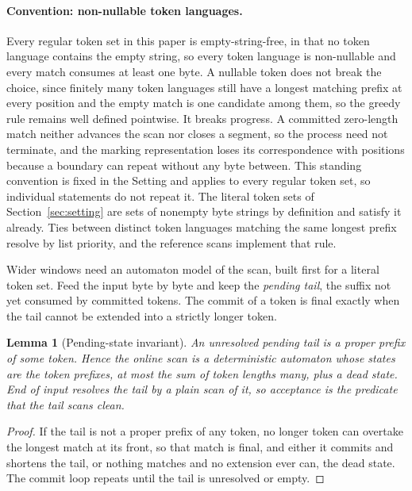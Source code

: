 \documentclass[11pt,a4paper]{article}
\theoremstyle{definition}
\theoremstyle{plain}
\newtheorem{lemma}{Lemma}
\begin{document}
\paragraph{Convention: non-nullable token languages.} Every regular token set in this paper is empty-string-free, in
that no token language contains the empty string, so every token language is non-nullable and every match consumes at
least one byte. A nullable token does not break the choice, since finitely many token languages still have a longest
matching prefix at every position and the empty match is one candidate among them, so the greedy rule remains well
defined pointwise. It breaks progress. A committed zero-length match neither advances the scan nor closes a segment, so
the process need not terminate, and the marking representation loses its correspondence with positions because a
boundary can repeat without any byte between. This standing convention is fixed in the Setting and applies to every
regular token set, so individual statements do not repeat it. The literal token sets of Section~\ref{sec:setting} are
sets of nonempty byte strings by definition and satisfy it already. Ties between distinct token languages matching the
same longest prefix resolve by list priority, and the reference scans implement that rule.

Wider windows need an automaton model of the scan, built first for a literal token set. Feed the input byte by byte and
keep the \emph{pending tail}, the suffix not yet consumed by committed tokens. The commit of a token is final exactly
when the tail cannot be extended into a strictly longer token.

\begin{lemma}[Pending-state invariant]\label{lem:pending}
An unresolved pending tail is a proper prefix of some token. Hence the online scan is a deterministic automaton whose
states are the token prefixes, at most the sum of token lengths many, plus a dead state. End of input resolves the tail
by a plain scan of it, so acceptance is the predicate that the tail scans clean.
\end{lemma}

\begin{proof}
If the tail is not a proper prefix of any token, no longer token can overtake the longest match at its front, so that
match is final, and either it commits and shortens the tail, or nothing matches and no extension ever can, the dead
state. The commit loop repeats until the tail is unresolved or empty.
\end{proof}
\end{document}
